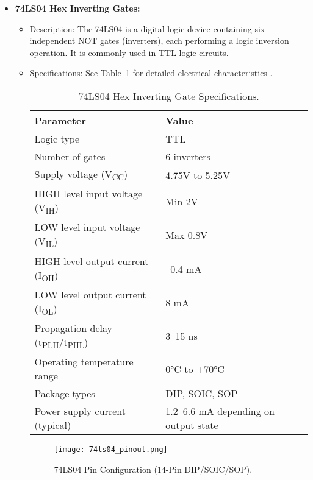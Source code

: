 \documentclass[conference]{IEEEtran}
\begin{document}
\begin{itemize}
    \item \textbf{74LS04 Hex Inverting Gates:} 
    \begin{itemize}
        \item Description: The 74LS04 is a digital logic device containing six independent NOT gates (inverters), each performing a logic inversion operation. It is commonly used in TTL logic circuits.
        \item Specifications: See Table~\ref{tab:74ls04_specs} for detailed electrical characteristics \cite{74LS04_Datasheet}.
        \begin{table}[h]
            \centering
            \begin{tabular}{ll}
                \toprule
                \textbf{Parameter} & \textbf{Value} \\
                \midrule
                Logic type & TTL \\
                Number of gates & 6 inverters \\
                Supply voltage (V\textsubscript{CC}) & 4.75V to 5.25V \\
                HIGH level input voltage (V\textsubscript{IH}) & Min 2V \\
                LOW level input voltage (V\textsubscript{IL}) & Max 0.8V \\
                HIGH level output current (I\textsubscript{OH}) & –0.4 mA \\
                LOW level output current (I\textsubscript{OL}) & 8 mA \\
                Propagation delay (t\textsubscript{PLH}/t\textsubscript{PHL}) & 3–15 ns \\
                Operating temperature range & 0°C to +70°C \\
                Package types & DIP, SOIC, SOP \\
                Power supply current (typical) & 1.2–6.6 mA depending on output state \\
                \bottomrule
            \end{tabular}
            \caption{74LS04 Hex Inverting Gate Specifications.}
            \label{tab:74ls04_specs}
        \end{table}
        \begin{figure}[h]
            \centering
            \texttt{[image: 74ls04\_pinout.png]} %
            \caption{74LS04 Pin Configuration (14-Pin DIP/SOIC/SOP).}
            \label{fig:74ls04_pinout}
        \end{figure}
    \end{itemize}


\end{itemize}
\end{document}
